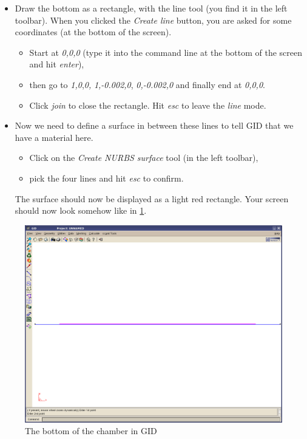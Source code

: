 \begin{itemize}
\item Draw the bottom as a rectangle, with the line tool (you find it in
the left toolbar). When you clicked the \emph{Create line} button,
you are asked for some coordinates (at the bottom of the screen). 

\begin{itemize}
\item Start at \emph{0,0,0} (type it into the command line at the bottom
of the screen and hit \emph{enter}), 
\item then go to \emph{1,0},\emph{0,} \emph{1,-0.002,0}, \emph{0,-0.002,0}
and finally end at \emph{0,0,0}. 
\item Click \emph{join} to close the rectangle. Hit \emph{esc} to leave
the \emph{line} mode.
\end{itemize}
\item Now we need to define a surface in between these lines to tell GID
that we have a material here. 

\begin{itemize}
\item Click on the \emph{Create NURBS surface} tool (in the left toolbar), 
\item pick the four lines and hit \emph{esc} to confirm. 
\end{itemize}
The surface should now be displayed as a light red rectangle. Your
screen should now look somehow like in \ref{tut_fsi:3.1}.

\end{itemize}
%
\begin{figure}[h]
\includegraphics[width=1\columnwidth,keepaspectratio]{Bilder/structure_01}


\caption{\label{tut_fsi:3.1} The bottom of the chamber in GID}
\end{figure}


